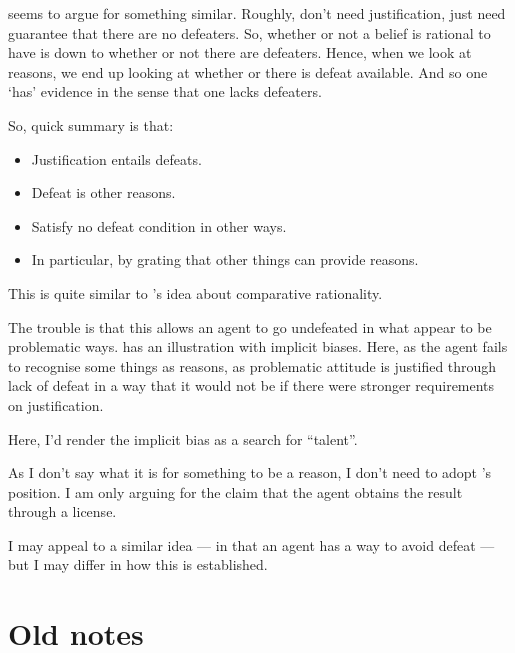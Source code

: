 \documentclass[10pt]{article}
\begin{document}
\newpage

\printbibliography


\newpage

\begin{note}[Schroeder]
  \textcite{Schroeder:2011a} seems to argue for something similar.
  Roughly, don't need justification, just need guarantee that there are no defeaters.
  So, whether or not a belief is rational to have is down to whether or not there are defeaters.
  Hence, when we look at reasons, we end up looking at whether or there is defeat available.
  And so one `has' evidence in the sense that one lacks defeaters.

  So, quick summary is that:
  \begin{itemize}
  \item Justification entails defeats.
  \item Defeat is other reasons.
  \item Satisfy no defeat condition in other ways.
  \item In particular, by grating that other things can provide reasons.
  \end{itemize}

  This is quite similar to \citeauthor{Lord:2018aa}'s idea about comparative rationality.

  The trouble is that this allows an agent to go undefeated in what appear to be problematic ways.
  \textcite{Schmidt:2019aa} has an illustration with implicit biases.
  Here, as the agent fails to recognise some things as reasons, as problematic attitude is justified through lack of defeat in a way that it would not be if there were stronger requirements on justification.

  Here, I'd render the implicit bias as a search for ``talent''.

  As I don't say what it is for something to be a reason, I don't need to adopt \citeauthor{Schroeder:2011aa}'s position.
  I am only arguing for the claim that the agent obtains the result through a license.

  I may appeal to a similar idea --- in that an agent has a way to avoid defeat --- but I may differ in how this is established.
\end{note}

\section*{Old notes}
\label{sec:old-notes}
\end{document}
